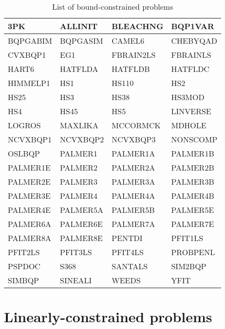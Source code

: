 \begin{longtable}{llll}
    \caption{List of bound-constrained problems}\\
    \toprule
    3PK         & ALLINIT   & BLEACHNG  & BQP1VAR\\
    \midrule
    BQPGABIM    & BQPGASIM  & CAMEL6    & CHEBYQAD\\
    \midrule
    CVXBQP1     & EG1       & FBRAIN2LS & FBRAINLS\\
    \midrule
    HART6       & HATFLDA   & HATFLDB   & HATFLDC\\
    \midrule
    HIMMELP1    & HS1       & HS110     & HS2\\
    \midrule
    HS25        & HS3       & HS38      & HS3MOD\\
    \midrule
    HS4         & HS45      & HS5       & LINVERSE\\
    \midrule
    LOGROS      & MAXLIKA   & MCCORMCK  & MDHOLE\\
    \midrule
    NCVXBQP1    & NCVXBQP2  & NCVXBQP3  & NONSCOMP\\
    \midrule
    OSLBQP      & PALMER1   & PALMER1A  & PALMER1B\\
    \midrule
    PALMER1E    & PALMER2   & PALMER2A  & PALMER2B\\
    \midrule
    PALMER2E    & PALMER3   & PALMER3A  & PALMER3B\\
    \midrule
    PALMER3E    & PALMER4   & PALMER4A  & PALMER4B\\
    \midrule
    PALMER4E    & PALMER5A  & PALMER5B  & PALMER5E\\
    \midrule
    PALMER6A    & PALMER6E  & PALMER7A  & PALMER7E\\
    \midrule
    PALMER8A    & PALMER8E  & PENTDI    & PFIT1LS\\
    \midrule
    PFIT2LS     & PFIT3LS   & PFIT4LS   & PROBPENL\\
    \midrule
    PSPDOC      & S368      & SANTALS   & SIM2BQP\\
    \midrule
    SIMBQP      & SINEALI   & WEEDS     & YFIT\\
    \bottomrule
    \end{longtable}

\section{Linearly-constrained problems}
\label{sec:list-linearly-constrained-problems}

